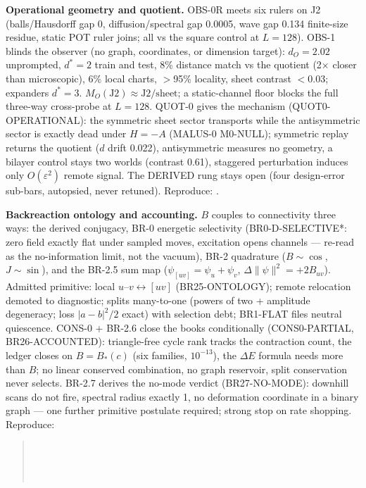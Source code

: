 \documentclass[11pt]{article}
\begin{document}
\textbf{Operational geometry and quotient.} OBS-0R meets six rulers on
J2 (balls/Hausdorff gap 0, diffusion/spectral gap 0.0005, wave gap 0.134
finite-size residue, static POT ruler joins; all vs the square control
at $L = 128$). OBS-1 blinds the observer (no graph, coordinates, or
dimension target): $d_O = 2.02$ unprompted, $d^* = 2$ train and test,
8\% distance match vs the quotient (2$\times$ closer than microscopic),
6\% local charts, $>$95\% locality, sheet contrast $< 0.03$; expanders
$d^* = 3$. $M_O(\mathrm{J2}) \approx \mathrm{J2}/\mathrm{sheet}$; a
static-channel floor blocks the full three-way cross-probe at $L = 128$.
QUOT-0 gives the mechanism (QUOT0-OPERATIONAL): the symmetric sheet
sector transports while the antisymmetric sector is exactly dead under
$H = -A$ (MALUS-0 M0-NULL); symmetric replay returns the quotient
($d$ drift 0.022), antisymmetric measures no geometry, a bilayer control
stays two worlds (contrast 0.61), staggered perturbation induces only
$O(\varepsilon^2)$ remote signal. The DERIVED rung stays open (four
design-error sub-bars, autopsied, never retuned).
Reproduce: .

\textbf{Backreaction ontology and accounting.} $B$ couples to
connectivity three ways: the derived conjugacy, BR-0 energetic
selectivity (BR0-D-SELECTIVE*: zero field exactly flat under sampled
moves, excitation opens channels --- re-read as the no-information
limit, not the vacuum), BR-2 quadrature ($B \sim \cos$, $J \sim \sin$),
and the BR-2.5 sum map ($\psi_{[uv]} = \psi_u + \psi_v$,
$\Delta\|\psi\|^2 = +2B_{uv}$). Admitted primitive: local
$u$--$v \leftrightarrow [uv]$ (BR25-ONTOLOGY); remote relocation demoted
to diagnostic; splits many-to-one (powers of two + amplitude degeneracy;
loss $|a-b|^2/2$ exact) with selection debt; BR1-FLAT files neutral
quiescence. CONS-0 + BR-2.6 close the books conditionally
(CONS0-PARTIAL, BR26-ACCOUNTED): triangle-free cycle rank tracks the
contraction count, the ledger closes on $B = B_*(c)$ (six families,
$10^{-13}$), the $\Delta E$ formula needs more than $B$; no linear
conserved combination, no graph reservoir, split conservation never
selects. BR-2.7 derives the no-mode verdict (BR27-NO-MODE): downhill
scans do not fire, spectral radius exactly 1, no deformation coordinate
in a binary graph --- one further primitive postulate required; strong
stop on rate shopping.
Reproduce:
\begin{quote}\small
{}\\
\\
\\
\end{quote}
\end{document}
